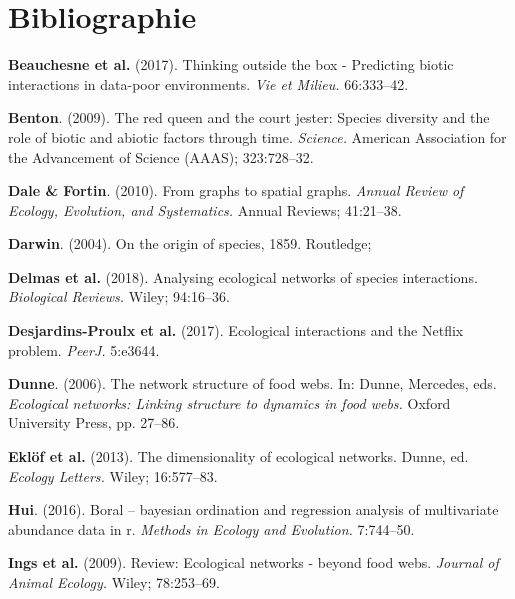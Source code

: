 \documentclass[
  12pt,
  a4paper,
  oneside]{report}
\begin{document}
\hypertarget{bibliographie}{%
\chapter*{Bibliographie}\label{bibliographie}}

\hypertarget{refs}{}
\leavevmode\hypertarget{ref-Beauchesne_2017b}{}%
\textbf{Beauchesne et al.} (2017). Thinking outside the box - Predicting
biotic interactions in data-poor environments. \emph{Vie et Milieu.}
66:333--42.

\leavevmode\hypertarget{ref-Benton_2009}{}%
\textbf{Benton}. (2009). The red queen and the court jester: Species
diversity and the role of biotic and abiotic factors through time.
\emph{Science.} American Association for the Advancement of Science
(AAAS); 323:728--32.

\leavevmode\hypertarget{ref-Dale_2010}{}%
\textbf{Dale \& Fortin}. (2010). From graphs to spatial graphs.
\emph{Annual Review of Ecology, Evolution, and Systematics.} Annual
Reviews; 41:21--38.

\leavevmode\hypertarget{ref-Darwin_2004}{}%
\textbf{Darwin}. (2004). On the origin of species, 1859. Routledge;

\leavevmode\hypertarget{ref-Delmas_2018}{}%
\textbf{Delmas et al.} (2018). Analysing ecological networks of species
interactions. \emph{Biological Reviews.} Wiley; 94:16--36.

\leavevmode\hypertarget{ref-Desjardins-Proulx_2017}{}%
\textbf{Desjardins-Proulx et al.} (2017). Ecological interactions and
the Netflix problem. \emph{PeerJ.} 5:e3644.

\leavevmode\hypertarget{ref-Dunne_2006}{}%
\textbf{Dunne}. (2006). The network structure of food webs. In: Dunne,
Mercedes, eds. \emph{Ecological networks: Linking structure to dynamics
in food webs.} Oxford University Press, pp. 27--86.

\leavevmode\hypertarget{ref-Eklof_2013}{}%
\textbf{Eklöf et al.} (2013). The dimensionality of ecological networks.
Dunne, ed. \emph{Ecology Letters.} Wiley; 16:577--83.

\leavevmode\hypertarget{ref-Hui_2016}{}%
\textbf{Hui}. (2016). Boral -- bayesian ordination and regression
analysis of multivariate abundance data in r. \emph{Methods in Ecology
and Evolution.} 7:744--50.

\leavevmode\hypertarget{ref-Ings_2009}{}%
\textbf{Ings et al.} (2009). Review: Ecological networks - beyond food
webs. \emph{Journal of Animal Ecology.} Wiley; 78:253--69.
\end{document}
